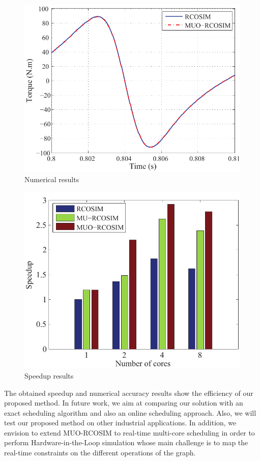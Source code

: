 \begin{figure}[htb]
\centering
  \includegraphics[scale=0.8]{figures/DF}
  \caption{Numerical results}
  \label{fig:df}
\end{figure}

\begin{figure}[htb]
\centering
  \includegraphics[scale=0.8]{figures/Speedup}
  \caption{Speedup results}
  \label{fig:spdup}
\end{figure}  

The obtained speedup and numerical accuracy results show the efficiency of our proposed method. In future work, we aim at comparing our solution with an exact scheduling algorithm and also an online scheduling approach. Also, we will test our proposed method on other industrial applications. In addition, we envision to extend MUO-RCOSIM to real-time multi-core scheduling in order to perform Hardware-in-the-Loop simulation whose main challenge is to map the real-time constraints on the different operations of the graph.